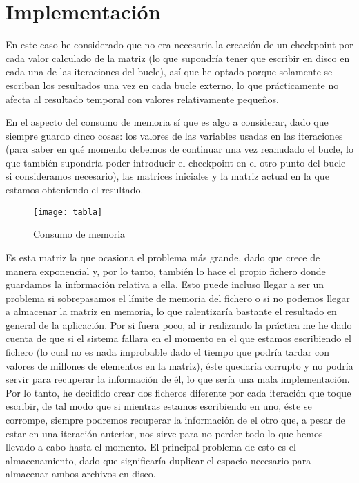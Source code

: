 \documentclass[a4paper]{article}
\begin{document}
\section{Implementación}

	En este caso he considerado que no era necesaria la creación de un checkpoint por cada valor calculado de la matriz (lo que supondría tener que escribir en disco en cada una de las iteraciones del bucle), así que he optado porque solamente se escriban los resultados una vez en cada bucle externo, lo que prácticamente no afecta al resultado temporal con valores relativamente pequeños.
	
	En el aspecto del consumo de memoria sí que es algo a considerar, dado que siempre guardo cinco cosas: los valores de las variables usadas en las iteraciones (para saber en qué momento debemos de continuar una vez reanudado el bucle, lo que también supondría poder introducir el checkpoint en el otro punto del bucle si consideramos necesario), las matrices iniciales y la matriz actual en la que estamos obteniendo el resultado.
	
	\newpage
	\begin{figure}[h!]
			\centering
			\texttt{[image: tabla]}
			\caption{Consumo de memoria}
	\end{figure}
	
	Es esta matriz la que ocasiona el problema más grande, dado que crece de manera exponencial y, por lo tanto, también lo hace el propio fichero donde guardamos la información relativa a ella. Esto puede incluso llegar a ser un problema si sobrepasamos el límite de memoria del fichero o si no podemos llegar a almacenar la matriz en memoria, lo que ralentizaría bastante el resultado en general de la aplicación.
	 Por si fuera poco, al ir realizando la práctica me he dado cuenta de que si el sistema fallara en el momento en el que estamos escribiendo el fichero (lo cual no es nada improbable dado el tiempo que podría tardar con valores de millones de elementos en la matriz), éste quedaría corrupto y no podría servir para recuperar la información de él, lo que sería una mala implementación. Por lo tanto, he decidido crear dos ficheros diferente por cada iteración que toque escribir, de tal modo que si mientras estamos escribiendo en uno, éste se corrompe, siempre podremos recuperar la información de el otro que, a pesar de estar en una iteración anterior, nos sirve para no perder todo lo que hemos llevado a cabo hasta el momento. El principal problema de esto es el almacenamiento, dado que significaría duplicar el espacio necesario para almacenar ambos archivos en disco.
	 
\end{document}
